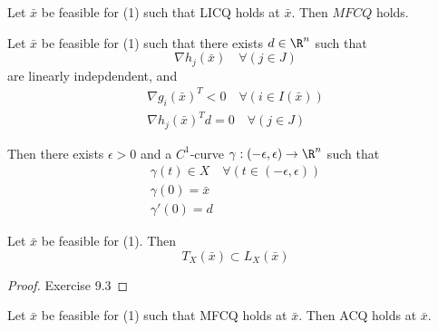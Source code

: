 \label{a7ef3f5}

Let $\bar x$ be feasible for (1) such that LICQ holds at $\bar x$.
Then $MFCQ$ holds.

\label{a9bea04}

Let $\bar x$ be feasible for (1) such that there exists $d\in\R^n$
such that
$$
	\nabla h_j(\bar x)\quad\forall(j\in J)
$$
are linearly indepdendent, and
\begin{gather*}
	\nabla g_i(\bar x)^T < 0  \quad\forall(i\in I(\bar x))\\
	\nabla h_j(\bar x)^Td = 0 \quad\forall(j\in J)
\end{gather*}

Then there exists $\epsilon>0$ and a $C^1$-curve
$\gamma:(-\epsilon,\epsilon)\to\R^n$ such that
\begin{gather*}
	\gamma(t) \in X\quad\forall(t\in(-\epsilon,\epsilon)) \\
	\gamma(0) = \bar x \\
	\gamma'(0)=d
\end{gather*}


\label{a08cd35}

Let $\bar x$ be feasible for (1). Then
$$
	T_X(\bar x)\subset L_X(\bar x)
$$

\begin{proof}
	Exercise 9.3
\end{proof}

\label{eddce03}

Let $\bar x$ be feasible for (1) such that MFCQ holds at $\bar x$.
Then ACQ holds at $\bar x$.

